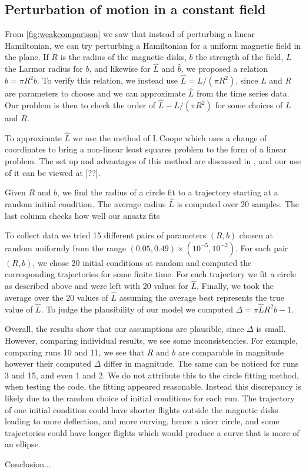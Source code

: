 \subsection{Perturbation of motion in a constant field}

From \cref{fig:weakcomparison} we saw that instead of perturbing a linear Hamiltonian, we can try perturbing a Hamiltonian for a uniform magnetic field in the plane. If $R$ is the radius of the magnetic disks, $b$ the strength of the field, $L$ the Larmor radius for $b$, and likewise for $\hat L$ and $\hat b$, we proposed a relation $\hat b = \pi R^2b$. To verify this relation, we instead use $\hat L =L/(\pi R^2)$, since $L$ and $R$ are parameters to choose and we can approximate $\hat L$ from the time series data. Our problem is then to check the order of $\hat L - L/(\pi R^2)$ for some choices of $L$ and $R$. 

To approximate $\hat L$ we use the method of I.\,Coope which uses a change of coordinates to bring a non-linear least squares problem to the form of a linear problem. The set up and advantages of this method are discussed in \cite{Coope93}, and our use of it can be viewed at [??]. 

\begin{table}[!ht]
\centering
\renewcommand{\arraystretch}{1.25}

\caption{Given $R$ and $b$, we find the radius of a circle fit to a trajectory starting at a random initial condition. The average radius $\hat L$ is computed over 20 samples. The last column checks how well our ansatz fits}
\label{tab:modeling}
\end{table}

To collect data we tried 15 different pairs of parameters $(R,b)$  chosen at random uniformly from the range $(0.05, 0.49)\times (10^{-5},10^{-2})$. For each pair $(R,b)$, we chose 20 initial conditions at random and computed the corresponding trajectories for some finite time. For each trajectory we fit a circle as described above and were left with 20 values for $\hat L$. Finally, we took the average over the 20 values of $\hat L$ assuming the average best represents the true value of $\hat L$. To judge the plausibility of our model we computed $\Delta = \pi\hat LR^2b-1$.

Overall, the results show that our assumptions are plausible, since $\Delta$ is small. However, comparing individual results, we see some inconsistencies. For example, comparing runs 10 and 11, we see that $R$ and $b$ are comparable in magnitude however their computed $\Delta$ differ in magnitude. The same can be noticed for runs 3 and 15, and even 1 and 2. We do not attribute this to the circle fitting method, when testing the code, the fitting appeared reasonable. Instead this discrepancy is likely due to the random choice of initial conditions for each run. The trajectory of one initial condition could have shorter flights outside the magnetic disks leading to more deflection, and more curving, hence a nicer circle, and some trajectories could have longer flights which would produce a curve that is more of an ellipse.

\color{red}Conclusion...\color{black}
